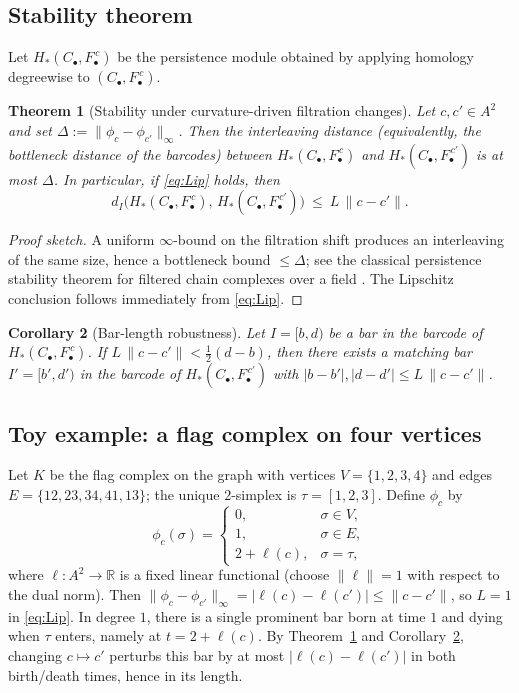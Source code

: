 \documentclass[preprint,12pt]{elsarticle}
\newtheorem{thm}{Theorem}
\newtheorem{cor}[thm]{Corollary}
\begin{document}
\subsection{Stability theorem}\label{subsec:stability}
Let $H_\ast(C_\bullet,F^{\,c}_\bullet)$ be the persistence module obtained by applying homology degreewise
to $(C_\bullet,F^{\,c}_\bullet)$.

\begin{thm}[Stability under curvature-driven filtration changes]
\label{thm:filtration-stability}
Let $c,c'\in A^2$ and set $\Delta:=\|\phi_c-\phi_{c'}\|_\infty$.
Then the interleaving distance (equivalently, the bottleneck distance of the barcodes) between
$H_\ast(C_\bullet,F^{\,c}_\bullet)$ and $H_\ast(C_\bullet,F^{\,c'}_\bullet)$ is at most $\Delta$.
In particular, if \eqref{eq:Lip} holds, then
\[
d_I\!\Big(H_\ast(C_\bullet,F^{\,c}_\bullet),\,H_\ast(C_\bullet,F^{\,c'}_\bullet)\Big)\ \le\ L\,\|c-c'\|.
\]
\end{thm}

\begin{proof}[Proof sketch]
A uniform $\infty$-bound on the filtration shift produces an interleaving of the same size,
hence a bottleneck bound $\le\Delta$; see the classical persistence stability theorem for
filtered chain complexes over a field
\cite{CohenSteinerEdelsbrunnerHarer2007,ChazalDeSilvaGlisseOudot2016}.
The Lipschitz conclusion follows immediately from \eqref{eq:Lip}.
\end{proof}

\begin{cor}[Bar-length robustness]\label{cor:bar-robustness}
Let $I=[b,d)$ be a bar in the barcode of $H_\ast(C_\bullet,F^{\,c}_\bullet)$.
If $L\,\|c-c'\|<\tfrac{1}{2}(d-b)$, then there exists a matching bar
$I'=[b',d')$ in the barcode of $H_\ast(C_\bullet,F^{\,c'}_\bullet)$
with $|b-b'|,|d-d'|\le L\,\|c-c'\|$.
\end{cor}

\subsection{Toy example: a flag complex on four vertices}\label{subsec:toy-rev}
Let $K$ be the flag complex on the graph with vertices $V=\{1,2,3,4\}$ and edges
$E=\{12,23,34,41,13\}$; the unique $2$-simplex is $\tau=[1,2,3]$.
Define $\phi_c$ by
\[
\phi_c(\sigma) = \begin{cases}
0,& \sigma\in V,\\
1,& \sigma\in E,\\
2+\ell(c),& \sigma=\tau,
\end{cases}
\]
where $\ell:A^2\to\mathbb{R}$ is a fixed linear functional (choose $\|\ell\|=1$ with respect to the dual norm).
Then $\|\phi_c-\phi_{c'}\|_\infty = |\ell(c)-\ell(c')|\le \|c-c'\|$, so $L=1$ in \eqref{eq:Lip}.
In degree $1$, there is a single prominent bar born at time $1$ and dying when $\tau$ enters,
namely at $t=2+\ell(c)$. By Theorem~\ref{thm:filtration-stability} and
Corollary~\ref{cor:bar-robustness}, changing $c\mapsto c'$ perturbs this bar by at most
$|\ell(c)-\ell(c')|$ in both birth/death times, hence in its length.
\end{document}
